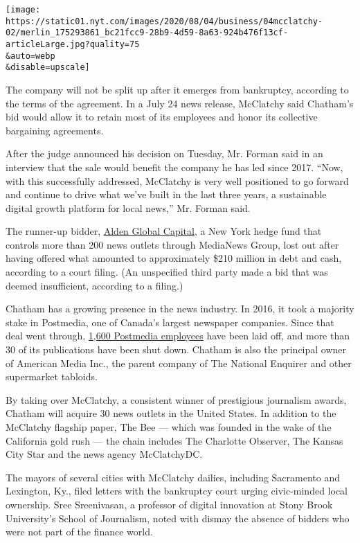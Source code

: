 \texttt{[image: https://static01.nyt.com/images/2020/08/04/business/04mcclatchy-02/merlin\_175293861\_bc21fcc9-28b9-4d59-8a63-924b476f13cf-articleLarge.jpg?quality=75\\\&auto=webp\\\&disable=upscale]}

The company will not be split up after it emerges from bankruptcy,
according to the terms of the agreement. In a July 24 news release,
McClatchy said Chatham's bid would allow it to retain most of its
employees and honor its collective bargaining agreements.

After the judge announced his decision on Tuesday, Mr. Forman said in an
interview that the sale would benefit the company he has led since 2017.
``Now, with this successfully addressed, McClatchy is very well
positioned to go forward and continue to drive what we've built in the
last three years, a sustainable digital growth platform for local
news,'' Mr. Forman said.

The runner-up bidder,
\href{https://www.nytimes.com/2020/07/02/business/media/tribune-alden-board-seat.html}{Alden
Global Capital}, a New York hedge fund that controls more than 200 news
outlets through MediaNews Group, lost out after having offered what
amounted to approximately \$210 million in debt and cash, according to a
court filing. (An unspecified third party made a bid that was deemed
insufficient, according to a filing.)

Chatham has a growing presence in the news industry. In 2016, it took a
majority stake in Postmedia, one of Canada's largest newspaper
companies. Since that deal went through,
\href{https://www.nytimes.com/2020/07/16/business/media/hedge-fund-chatham-mcclatchy-postmedia-newspapers.html}{1,600
Postmedia employees} have been laid off, and more than 30 of its
publications have been shut down. Chatham is also the principal owner of
American Media Inc., the parent company of The National Enquirer and
other supermarket tabloids.

By taking over McClatchy, a consistent winner of prestigious journalism
awards, Chatham will acquire 30 news outlets in the United States. In
addition to the McClatchy flagship paper, The Bee --- which was founded
in the wake of the California gold rush --- the chain includes The
Charlotte Observer, The Kansas City Star and the news agency
McClatchyDC.

The mayors of several cities with McClatchy dailies, including
Sacramento and Lexington, Ky., filed letters with the bankruptcy court
urging civic-minded local ownership. Sree Sreenivasan, a professor of
digital innovation at Stony Brook University's School of Journalism,
noted with dismay the absence of bidders who were not part of the
finance world.

